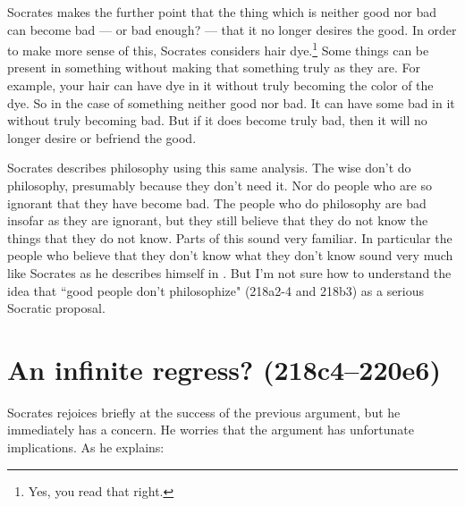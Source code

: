 \documentclass[11pt]{article}
\begin{document}
Socrates makes the further point that the thing which is neither good nor bad can become bad --- or bad enough? --- that it no longer desires the good.  In order to make more sense of this, Socrates considers hair dye.\footnote{Yes, you read that right.}  Some things can be present in something without making that something truly as they are.  For example, your hair can have dye in it without truly becoming the color of the dye.  So in the case of something neither good nor bad.  It can have some bad in it without truly becoming bad.  But if it does become truly bad, then it will no longer desire or befriend the good.

Socrates describes philosophy using this same analysis.  The wise don't do philosophy, presumably because they don't need it.  Nor do people who are so ignorant that they have become bad.  The people who do philosophy are bad insofar as they are ignorant, but they still believe that they do not know the things that they do not know.  Parts of this sound very familiar.  In particular the people who believe that they don't know what they don't know sound very much like Socrates as he describes himself in .  But I'm not sure how to understand the idea that ``good people don't philosophize" (218a2-4 and 218b3) as a serious Socratic proposal.

\section{An infinite regress? (218c4--220e6)}

Socrates rejoices briefly at the success of the previous argument, but he immediately has a concern.  He worries that the argument has unfortunate implications.  As he explains:
\end{document}
